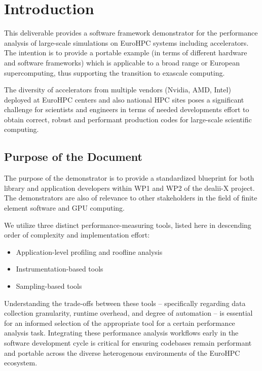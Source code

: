 \documentclass[a4paper,12pt]{article}
\begin{document}
\vspace*{2cm}

\disclaimer

\newpage

\tableofcontents %

\newpage

\section{{Introduction}}

This deliverable provides a software framework demonstrator for the performance
analysis of large-scale simulations on EuroHPC systems including accelerators.
The intention is to provide a portable example (in terms of different hardware and software frameworks)
which is applicable to a broad range or European supercomputing,
thus supporting the transition to exascale computing.

The diversity of accelerators from multiple vendors (Nvidia, AMD, Intel) deployed
at EuroHPC centers and also national HPC sites poses a significant challenge
for scientists and engineers in terms of needed developments effort to obtain
correct, robust and performant production codes for large-scale scientific computing.

\subsection{{Purpose of the Document}}

The purpose of the demonstrator is to provide a standardized blueprint for
both library and application developers within WP1 and WP2 of the dealii-X project.
The demonstrators are also of relevance to other stakeholders in the field of finite element
software and GPU computing.

We utilize three distinct performance-measuring tools, listed here in descending order
of complexity and implementation effort:
\begin{itemize}
    \item Application-level profiling and roofline analysis
    \item Instrumentation-based tools
    \item Sampling-based tools
\end{itemize}

Understanding the trade-offs between these tools -- specifically regarding data
collection granularity, runtime overhead, and degree of automation -- is essential
for an informed selection of the appropriate tool for a certain performance
analysis task.
Integrating these performance analysis workflows early in the software development
cycle is critical for ensuring codebases remain performant and portable across the
diverse heterogenous environments of the EuroHPC ecosystem.
\end{document}
